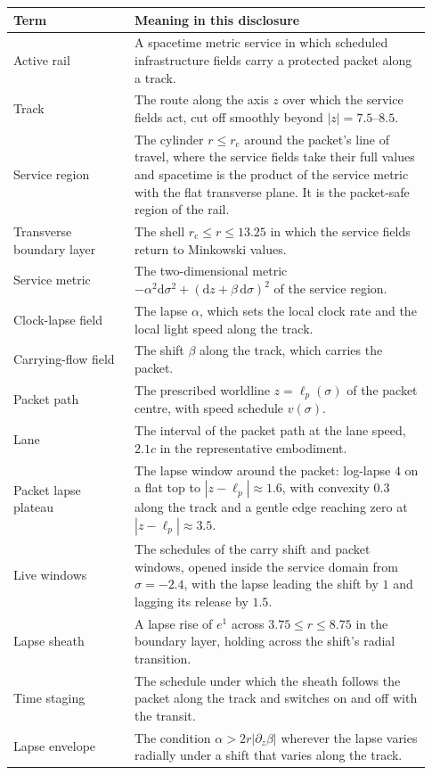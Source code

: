 \documentclass[11pt]{article}
\newcommand{\dd}{\mathrm{d}}
\newcommand{\sig}{\sigma}
\newcommand{\rc}{r_{\mathrm c}}
\begin{document}
\begin{longtable}{L{0.27\linewidth}L{0.66\linewidth}}
\toprule
\textbf{Term} & \textbf{Meaning in this disclosure} \\
\midrule
Active rail & A spacetime metric service in which scheduled infrastructure fields carry a protected packet along a track. \\
Track & The route along the axis $z$ over which the service fields act, cut off smoothly beyond $|z|=7.5$--$8.5$. \\
Service region & The cylinder $r\le\rc$ around the packet's line of travel, where the service fields take their full values and spacetime is the product of the service metric with the flat transverse plane. It is the packet-safe region of the rail. \\
Transverse boundary layer & The shell $\rc\le r\le13.25$ in which the service fields return to Minkowski values. \\
Service metric & The two-dimensional metric $-\alpha^2\dd\sig^2+(\dd z+\beta\,\dd\sig)^2$ of the service region. \\
Clock-lapse field & The lapse $\alpha$, which sets the local clock rate and the local light speed along the track. \\
Carrying-flow field & The shift $\beta$ along the track, which carries the packet. \\
Packet path & The prescribed worldline $z=\ell_p(\sig)$ of the packet centre, with speed schedule $v(\sig)$. \\
Lane & The interval of the packet path at the lane speed, $2.1c$ in the representative embodiment. \\
Packet lapse plateau & The lapse window around the packet: log-lapse $4$ on a flat top to $|z-\ell_p|\approx1.6$, with convexity $0.3$ along the track and a gentle edge reaching zero at $|z-\ell_p|\approx3.5$. \\
Live windows & The schedules of the carry shift and packet windows, opened inside the service domain from $\sig=-2.4$, with the lapse leading the shift by $1$ and lagging its release by $1.5$. \\
Lapse sheath & A lapse rise of $e^{1}$ across $3.75\le r\le8.75$ in the boundary layer, holding across the shift's radial transition. \\
Time staging & The schedule under which the sheath follows the packet along the track and switches on and off with the transit. \\
Lapse envelope & The condition $\alpha>2r|\partial_z\beta|$ wherever the lapse varies radially under a shift that varies along the track. \\

\end{longtable}
\end{document}
